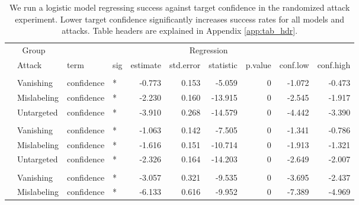\begin{longtable}[t]{llllrrrrrr}
\caption{\label{tab:target_conf_table}We run a logistic model regressing success against target confidence in the randomized attack experiment. Lower target confidence significantly increases success rates for all models and attacks. Table headers are explained in Appendix \ref{app:tab_hdr}.}\\
\toprule
\multicolumn{2}{c}{Group} & \multicolumn{8}{c}{Regression} \\
\cmidrule(l{3pt}r{3pt}){1-2} \cmidrule(l{3pt}r{3pt}){3-10}
 & Attack & term & sig & estimate & std.error & statistic & p.value & conf.low & conf.high\\
\midrule
\addlinespace[0.3em]
\multicolumn{10}{l}{\textbf{YOLOv3}}\\
\hspace{1em} & Vanishing & confidence & * & -0.773 & 0.153 & -5.059 & 0 & -1.072 & -0.473\\
\cmidrule{2-10}\nopagebreak
\hspace{1em} & Mislabeling & confidence & * & -2.230 & 0.160 & -13.915 & 0 & -2.545 & -1.917\\
\cmidrule{2-10}\nopagebreak
\hspace{1em} & Untargeted & confidence & * & -3.910 & 0.268 & -14.579 & 0 & -4.442 & -3.390\\
\cmidrule{1-10}\pagebreak[0]
\addlinespace[0.3em]
\multicolumn{10}{l}{\textbf{SSD}}\\
\hspace{1em} & Vanishing & confidence & * & -1.063 & 0.142 & -7.505 & 0 & -1.341 & -0.786\\
\cmidrule{2-10}\nopagebreak
\hspace{1em} & Mislabeling & confidence & * & -1.616 & 0.151 & -10.714 & 0 & -1.913 & -1.321\\
\cmidrule{2-10}\nopagebreak
\hspace{1em} & Untargeted & confidence & * & -2.326 & 0.164 & -14.203 & 0 & -2.649 & -2.007\\
\cmidrule{1-10}\pagebreak[0]
\addlinespace[0.3em]
\multicolumn{10}{l}{\textbf{RetinaNet}}\\
\hspace{1em} & Vanishing & confidence & * & -3.057 & 0.321 & -9.535 & 0 & -3.695 & -2.437\\
\cmidrule{2-10}\nopagebreak
\hspace{1em} & Mislabeling & confidence & * & -6.133 & 0.616 & -9.952 & 0 & -7.389 & -4.969\\

\end{longtable}
